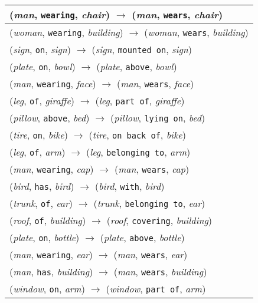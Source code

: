 \documentclass[runningheads]{llncs}
\begin{document}
{\begin{longtable}{ l }
(\textit{man}, \texttt{wearing}, \textit{chair}) $\rightarrow$ (\textit{man}, \texttt{wears}, \textit{chair}) \\ \hline
(\textit{woman}, \texttt{wearing}, \textit{building}) $\rightarrow$ (\textit{woman}, \texttt{wears}, \textit{building}) \\ \hline
(\textit{sign}, \texttt{on}, \textit{sign}) $\rightarrow$ (\textit{sign}, \texttt{mounted on}, \textit{sign}) \\ \hline
(\textit{plate}, \texttt{on}, \textit{bowl}) $\rightarrow$ (\textit{plate}, \texttt{above}, \textit{bowl}) \\ \hline
(\textit{man}, \texttt{wearing}, \textit{face}) $\rightarrow$ (\textit{man}, \texttt{wears}, \textit{face}) \\ \hline
(\textit{leg}, \texttt{of}, \textit{giraffe}) $\rightarrow$ (\textit{leg}, \texttt{part of}, \textit{giraffe}) \\ \hline
(\textit{pillow}, \texttt{above}, \textit{bed}) $\rightarrow$ (\textit{pillow}, \texttt{lying on}, \textit{bed}) \\ \hline
(\textit{tire}, \texttt{on}, \textit{bike}) $\rightarrow$ (\textit{tire}, \texttt{on back of}, \textit{bike}) \\ \hline
(\textit{leg}, \texttt{of}, \textit{arm}) $\rightarrow$ (\textit{leg}, \texttt{belonging to}, \textit{arm}) \\ \hline
(\textit{man}, \texttt{wearing}, \textit{cap}) $\rightarrow$ (\textit{man}, \texttt{wears}, \textit{cap}) \\ \hline
(\textit{bird}, \texttt{has}, \textit{bird}) $\rightarrow$ (\textit{bird}, \texttt{with}, \textit{bird}) \\ \hline
(\textit{trunk}, \texttt{of}, \textit{ear}) $\rightarrow$ (\textit{trunk}, \texttt{belonging to}, \textit{ear}) \\ \hline
(\textit{roof}, \texttt{of}, \textit{building}) $\rightarrow$ (\textit{roof}, \texttt{covering}, \textit{building}) \\ \hline
(\textit{plate}, \texttt{on}, \textit{bottle}) $\rightarrow$ (\textit{plate}, \texttt{above}, \textit{bottle}) \\ \hline
(\textit{man}, \texttt{wearing}, \textit{ear}) $\rightarrow$ (\textit{man}, \texttt{wears}, \textit{ear}) \\ \hline
(\textit{man}, \texttt{has}, \textit{building}) $\rightarrow$ (\textit{man}, \texttt{wears}, \textit{building}) \\ \hline
(\textit{window}, \texttt{on}, \textit{arm}) $\rightarrow$ (\textit{window}, \texttt{part of}, \textit{arm}) \\ \hline
\end{longtable}
}
\end{document}
